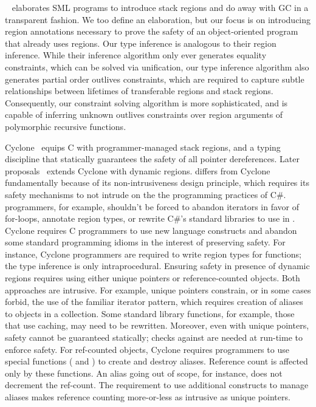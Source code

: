 ~\cite{tofte97} elaborates SML programs to introduce stack regions and
do away with GC in a transparent fashion. We too define an
elaboration, but our focus is on introducing region annotations
necessary to prove the safety of an object-oriented program that
already uses regions.
Our type inference is analogous to their region inference. While their
inference algorithm only ever generates equality constraints, which
can be solved via unification, our type inference algorithm also
generates partial order outlives constraints, which are required to
capture subtle relationships between lifetimes of transferable regions
and stack regions. Consequently, our constraint solving algorithm is
more sophisticated, and is capable of inferring unknown outlives
constraints over region arguments of polymorphic recursive functions.

Cyclone~\cite{cyclone02} equips C with programmer-managed stack
regions, and a typing discipline that statically guarantees the safety
of all pointer dereferences. Later
proposals~\cite{cyclone04,cycloneSCP} extends Cyclone with dynamic
regions. \name differs from Cyclone fundamentally because of its
non-intrusiveness design principle, which requires its safety
mechanisms to not intrude on the the programming practices of C\#.
\name programmers, for example, shouldn’t be forced to abandon
iterators in favor of for-loops, annotate region types, or rewrite
C\#'s standard libraries to use in \name. Cyclone requires C
programmers to use new language constructs and abandon some standard
programming idioms in the interest of preserving safety. For instance,
Cyclone programmers are required to write region types for functions;
the type inference is only intraprocedural. Ensuring safety in
presence of dynamic regions requires using either unique pointers or
reference-counted objects.  Both approaches are intrusive. For
example, unique pointers constrain, or in some cases forbid, the use
of the familiar iterator pattern, which requires creation of aliases
to objects in a collection. Some standard library functions, for
example, those that use caching, may need to be rewritten.  Moreover,
even with unique pointers, safety cannot be guaranteed statically;
checks against  are needed at run-time to enforce safety. For
ref-counted objects, Cyclone requires programmers to use special
functions ( and ) to create and
destroy aliases.  Reference count is affected only by these functions.
An alias going out of scope, for instance, does not decrement the
ref-count. The requirement to use additional constructs
to manage aliases makes reference counting more-or-less as intrusive
as unique pointers.

